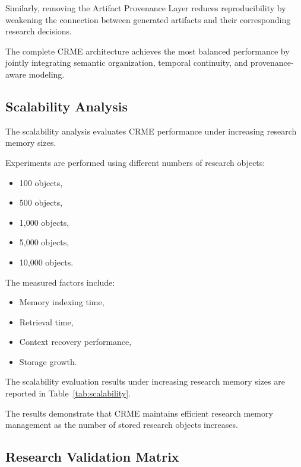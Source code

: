 Similarly, removing the Artifact Provenance Layer reduces reproducibility by weakening the connection between generated artifacts and their corresponding research decisions.

The complete CRME architecture achieves the most balanced performance by jointly integrating semantic organization, temporal continuity, and provenance-aware modeling.

\subsection{Scalability Analysis}

The scalability analysis evaluates CRME performance under increasing research memory sizes.

Experiments are performed using different numbers of research objects:

\begin{itemize}

\item 100 objects,
\item 500 objects,
\item 1,000 objects,
\item 5,000 objects,
\item 10,000 objects.

\end{itemize}


The measured factors include:

\begin{itemize}

\item Memory indexing time,
\item Retrieval time,
\item Context recovery performance,
\item Storage growth.

\end{itemize}


The scalability evaluation results under increasing research memory sizes are reported in
Table~\ref{tab:scalability}.




The results demonstrate that CRME maintains efficient research memory management as the number of stored research objects increases.



\subsection{Research Validation Matrix}

